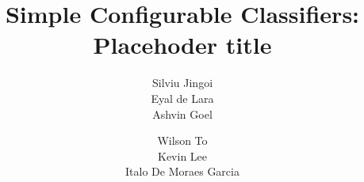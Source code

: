\documentclass[letterpaper,twocolumn]{acm_proc_article-sp}
\begin{document}
\date{}


\title{Simple Configurable Classifiers: Placehoder title}


\author{
\alignauthor Silviu Jingoi\\
\alignauthor Eyal de Lara\\
\alignauthor Ashvin Goel\\
\and
\alignauthor Wilson To\\
\alignauthor Kevin Lee\\
\alignauthor Italo De Moraes Garcia\\
}

\maketitle













\end{document}
